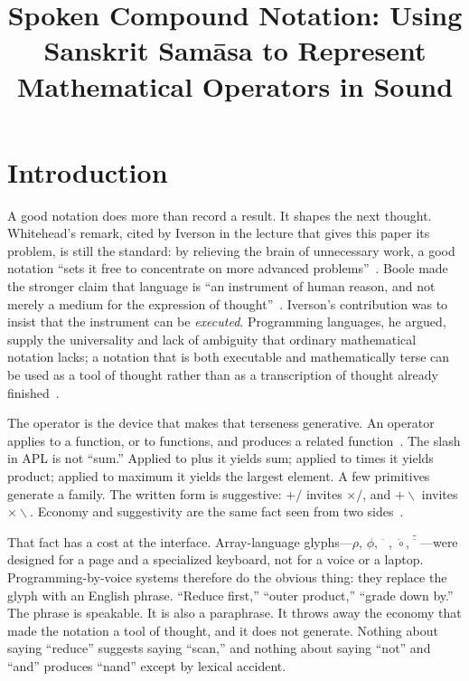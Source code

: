 \documentclass[manuscript, review, anonymous]{acmart}
\title{Spoken Compound Notation: Using Sanskrit Sam{\=a}sa to Represent Mathematical Operators in Sound}
\begin{document}
\maketitle

\section{Introduction}

A good notation does more than record a result. It shapes the next thought. Whitehead's remark, cited by Iverson in the lecture that gives this paper its problem, is still the standard: by relieving the brain of unnecessary work, a good notation ``sets it free to concentrate on more advanced problems''~\cite{Iverson1980Notation,Whitehead1911Math}. Boole made the stronger claim that language is ``an instrument of human reason, and not merely a medium for the expression of thought''~\cite{Boole1854Laws}. Iverson's contribution was to insist that the instrument can be \emph{executed}. Programming languages, he argued, supply the universality and lack of ambiguity that ordinary mathematical notation lacks; a notation that is both executable and mathematically terse can be used as a tool of thought rather than as a transcription of thought already finished~\cite{Iverson1980Notation,Iverson1962APL}.

The operator is the device that makes that terseness generative. An operator applies to a function, or to functions, and produces a related function~\cite{Iverson1979Operators}. The slash in APL is not ``sum.'' Applied to plus it yields sum; applied to times it yields product; applied to maximum it yields the largest element. A few primitives generate a family. The written form is suggestive: $+/$ invites $\times/$, and $+\backslash$ invites $\times\backslash$. Economy and suggestivity are the same fact seen from two sides~\cite{Iverson1980Notation}.

That fact has a cost at the interface. Array-language glyphs---$\rho$, $\phi$, $\ddot{\phantom{a}}$, $\ddot{\circ}$, $\tilde{\ddot{\phantom{a}}}$---were designed for a page and a specialized keyboard, not for a voice or a laptop. Programming-by-voice systems therefore do the obvious thing: they replace the glyph with an English phrase. ``Reduce first,'' ``outer product,'' ``grade down by.'' The phrase is speakable. It is also a paraphrase. It throws away the economy that made the notation a tool of thought, and it does not generate. Nothing about saying ``reduce'' suggests saying ``scan,'' and nothing about saying ``not'' and ``and'' produces ``nand'' except by lexical accident.
\end{document}
